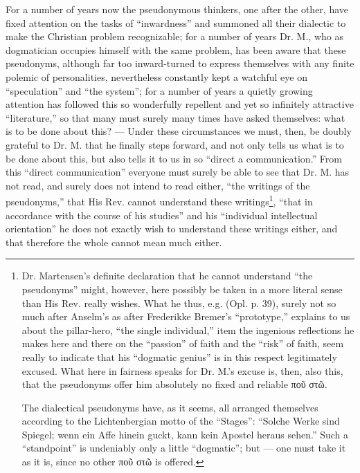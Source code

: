 \documentclass[12pt,a4paper,openany]{book}
\newcommand{\opage}[1]{\marginnote{\footnotesize\textit{[#1]}}}
\begin{document}
For a number of years now the pseudonymous thinkers,
one after the other, have fixed attention on
\setcounter{footnote}{0}%
\opage{68}the tasks of ``inwardness'' and summoned all their dialectic to
make the Christian problem recognizable; for a number
of years Dr. M., who as dogmatician occupies himself with
the same problem, has been aware that these pseudonyms,
although far too inward-turned to express themselves with any
finite polemic of personalities, nevertheless constantly kept
a watchful eye on ``speculation'' and ``the system''; for
a number of years a quietly growing attention has followed
this so wonderfully repellent and yet so infinitely attractive
``literature,'' so that many must surely many times
have asked themselves: what is to be done about this? --- Under
these circumstances we must, then, be doubly grateful
to Dr. M. that he finally steps forward, and not only tells us
what is to be done about this, but also tells it to us in so
``direct a communication.'' From this ``direct communication''
everyone must surely be able to see that Dr. M. has not read, and
surely does not intend to read either, ``the writings of the pseudonyms,'' that
His Rev. cannot understand these writings\footnote[1]{Dr. Martensen's definite declaration that he cannot understand ``the pseudonyms'' might, however, here possibly be taken in a more literal sense than His Rev. really wishes. What he thus, e.g. (Opl. p. 39), surely not so much after Anselm's as after Frederikke Bremer's ``prototype,'' explains to us about the pillar-hero, ``the single individual,'' item the ingenious reflections he makes here and there on the ``passion'' of faith and the ``risk'' of faith, seem really to indicate that his ``dogmatic genius'' is in this respect legitimately excused. What here in fairness speaks for Dr. M.'s excuse is, then, also this, that the pseudonyms offer him absolutely no fixed and reliable ποῦ στῶ.\par The dialectical pseudonyms have, as it seems, all arranged themselves according to the Lichtenbergian motto of the ``Stages'': ``Solche Werke sind Spiegel; wenn ein Affe hinein guckt, kann kein Apostel heraus sehen.'' Such a ``standpoint'' is undeniably only a little ``dogmatic''; but --- one must take it as it is, since no other ποῦ στῶ is offered.}, ``that in accordance with the course of his
\setcounter{footnote}{0}%
\opage{69}studies'' and his ``individual intellectual orientation'' he does not exactly
wish to understand these writings either, and that therefore the
whole cannot mean much either.
\end{document}
